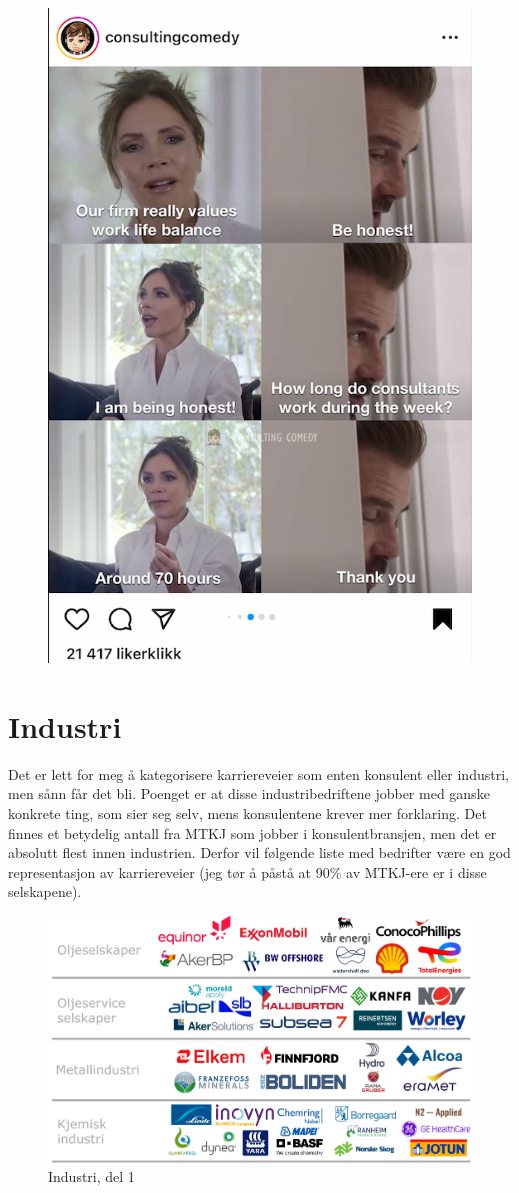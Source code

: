 \begin{figure}[H]
    \centering
    \includegraphics[width=0.5\linewidth]{images/konsulent_meme.png}
\end{figure}


\section{Industri}

Det er lett for meg å kategorisere karriereveier som enten konsulent eller industri, men sånn får det bli. Poenget er at disse industribedriftene jobber med ganske konkrete ting, som sier seg selv, mens konsulentene krever mer forklaring. Det finnes et betydelig antall fra MTKJ som jobber i konsulentbransjen, men det er absolutt flest innen industrien. Derfor vil følgende liste med bedrifter være en god representasjon av karriereveier (jeg tør å påstå at 90\% av MTKJ-ere er i disse selskapene).

\begin{figure}[H]
    \centering
    \includegraphics[width=1\linewidth]{images/Industri1.pdf}
    \caption{Industri, del 1}
    \label{fig:industri1}
\end{figure}

